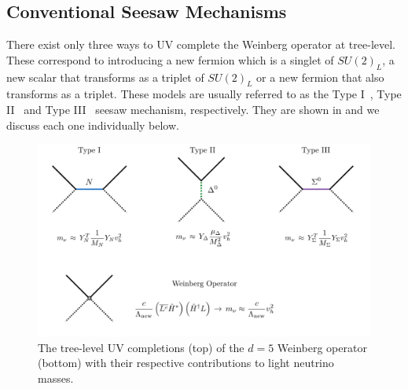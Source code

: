 \subsection{Conventional Seesaw Mechanisms}\label{sec:seesaws}

There exist only three ways to UV complete the Weinberg operator at tree-level. These correspond to introducing a new fermion which is a singlet of $SU(2)_L$, a new scalar that transforms as a triplet of $SU(2)_L$ or a new fermion that also transforms as a triplet. These models are usually referred to as the Type I~\cite{Minkowski:1977sc,Mohapatra:1979ia,Yanagida:1979as,GellMann:1980vs}, Type II~\cite{Konetschny:1977bn,Cheng:1980qt,Lazarides:1980nt,Schechter:1980gr,Mohapatra:1980yp} and Type III~\cite{Foot:1988aq} seesaw mechanism, respectively. They are shown in  and we discuss each one individually below.
%
\begin{figure}[t]
\centering
\includegraphics[width=\textwidth]{seesaw_mechanisms.pdf}
\caption[The tree-level UV completions of the Weinberg operator.]{The tree-level UV completions (top) of the $d=5$ Weinberg operator (bottom) with their respective contributions to light neutrino masses.\label{fig:seesaw_mechanisms}}
\end{figure}
%


